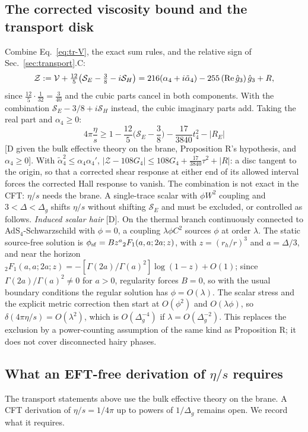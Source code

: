 \subsection{The corrected viscosity bound and the transport disk}
Combine Eq.~\eqref{eq:tr-V}, the exact sum rules, and the relative sign of Sec.~\ref{sec:transport}.C:
\begin{equation}
\mathcal Z:=\mathcal V+\tfrac{12}5\big(\mathcal S_E-\tfrac38-i\mathcal S_H\big)=216(\alpha_4+i\tilde\alpha_4)-255\,({\rm Re}\,\hat g_3)\,\hat g_3+R,
\end{equation}
since $\tfrac{12}5\cdot\tfrac1{32}=\tfrac3{40}$ and the cubic parts cancel in both components. With the combination
$\mathcal S_E-3/8+i\mathcal S_H$ instead, the cubic imaginary parts add. Taking the real part and $\alpha_4\ge0$:
\begin{equation}
4\pi\frac\eta s\ge1-\frac{12}5\Big(\mathcal S_E-\frac38\Big)-\frac{17}{3840}t_4^2-|R_E|
\end{equation}
[D given the bulk effective theory on the brane, Proposition R's hypothesis, and $\alpha_4\ge0$]. With
$\tilde\alpha_4^2\le\alpha_4\alpha_4'$, $|\mathcal Z-108G_4|\le108G_4+\tfrac{17}{3840}\tau^2+|R|$: a disc tangent to the origin,
so that a corrected shear response at either end of its allowed interval forces the corrected Hall response to vanish. The
combination is not exact in the CFT: $\eta/s$ needs the brane. A single-trace scalar with $\phi W^2$ coupling and
$3<\Delta<\Delta_g$ shifts $\eta/s$ without shifting $\mathcal S_E$ and must be excluded, or controlled as follows.
\emph{Induced scalar hair} [D]. On the thermal branch continuously connected to AdS$_4$-Schwarzschild with $\phi=0$, a coupling
$\lambda\phi C^2$ sources $\phi$ at order $\lambda$. The static source-free solution is $\phi_{\rm sf}=Bz^a{}_2F_1(a,a;2a;z)$, with
$z=(r_h/r)^3$ and $a=\Delta/3$, and near the horizon ${}_2F_1(a,a;2a;z)=-[\Gamma(2a)/\Gamma(a)^2]\log(1-z)+O(1)$; since
$\Gamma(2a)/\Gamma(a)^2\ne0$ for $a>0$, regularity forces $B=0$, so with the usual boundary conditions the regular solution has
$\phi=O(\lambda)$. The scalar stress and the explicit metric correction then start at $O(\phi^2)$ and $O(\lambda\phi)$, so
$\delta(4\pi\eta/s)=O(\lambda^2)$, which is $O(\Delta_g^{-4})$ if $\lambda=O(\Delta_g^{-2})$. This replaces the exclusion by a
power-counting assumption of the same kind as Proposition R; it does not cover disconnected hairy phases.

\subsection{What an EFT-free derivation of \texorpdfstring{$\eta/s$}{eta/s} requires}
The transport statements above use the bulk effective theory on the brane. A CFT derivation of $\eta/s=1/4\pi$ up to powers
of $1/\Delta_g$ remains open. We record what it requires.

